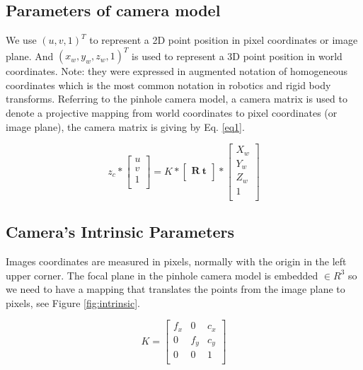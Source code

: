 \subsection{Parameters of camera model}
We use $(u,v,1)^{T}$ to represent a 2D point position in pixel coordinates or image plane. And $(x_{w},y_{w},z_{w},1)^{T}$ is used to represent a 3D point position in world coordinates. Note: they were expressed in augmented notation of homogeneous coordinates which is the most common notation in robotics and rigid body transforms. Referring to the pinhole camera model, a camera matrix is used to denote a projective mapping from world coordinates to pixel coordinates (or image plane), the camera matrix is giving by Eq. \ref{eq1}.

\begin{equation}\label{eq1}
z_{c}*
\left[ {\begin{array}{c}
u \\
v \\
1 \\
\end{array} } \right]
= K*
\left[ {\begin{array}{c}
\textbf{R} \ \textbf{t} \\
\end{array} } \right]
*\left[ {\begin{array}{c}
X_{w}\\
Y_{w} \\
Z_{w} \\
1\\
\end{array} } \right]\end{equation}

\subsection{Camera's Intrinsic Parameters}
Images coordinates are measured in pixels, normally with the origin in the left upper corner. The focal plane in the pinhole camera model is embedded $\in R^{3}$ so we need to have a mapping that translates the points from the image plane to pixels, see Figure \ref{fig:intrinsic}.

\begin{equation}\label{eq2}
   K=
    \left[ {\begin{array}{cccc}
   f_{x} & 0 & c_{x} \\
   0 & f_{y} & c_{y} \\
   0 & 0 & 1\\

  \end{array} } \right]    
\end{equation}



